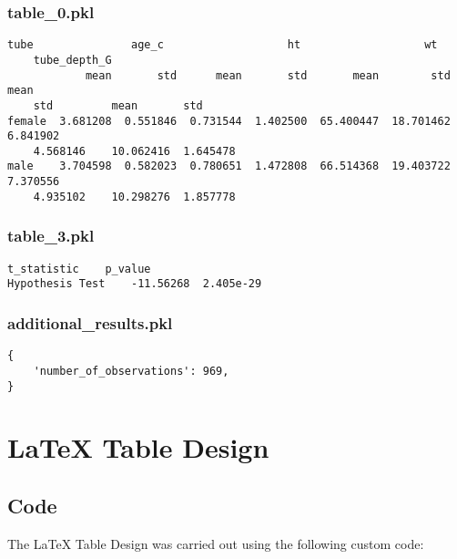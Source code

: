 \documentclass[11pt]{article}
\begin{document}
\subsubsection*{table\_0.pkl}

\begin{Verbatim}[tabsize=4]
            tube               age_c                   ht                   wt
	tube_depth_G
            mean       std      mean       std       mean        std      mean
	std         mean       std
female  3.681208  0.551846  0.731544  1.402500  65.400447  18.701462  6.841902
	4.568146    10.062416  1.645478
male    3.704598  0.582023  0.780651  1.472808  66.514368  19.403722  7.370556
	4.935102    10.298276  1.857778
\end{Verbatim}

\subsubsection*{table\_3.pkl}

\begin{Verbatim}[tabsize=4]
                 t_statistic    p_value
Hypothesis Test    -11.56268  2.405e-29
\end{Verbatim}

\subsubsection*{additional\_results.pkl}

\begin{Verbatim}[tabsize=4]
{
    'number_of_observations': 969,
}
\end{Verbatim}

\section{LaTeX Table Design}
\subsection{{Code}}
The LaTeX Table Design was carried out using the following custom code:
\end{document}
